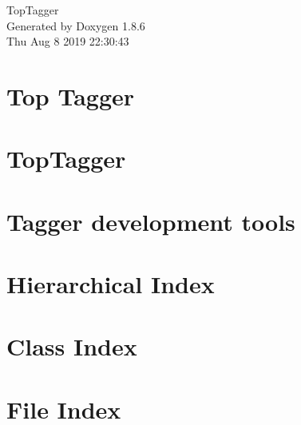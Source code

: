 \documentclass[twoside]{book}
\newcommand{\clearemptydoublepage}{%
  \newpage{\pagestyle{empty}\cleardoublepage}%
}
\begin{document}
\hypersetup{pageanchor=false}
\begin{titlepage}
\vspace*{7cm}
\begin{center}%
{\Large Top\-Tagger }\\
\vspace*{1cm}
{\large Generated by Doxygen 1.8.6}\\
\vspace*{0.5cm}
{\small Thu Aug 8 2019 22:30:43}\\
\end{center}
\end{titlepage}
\clearemptydoublepage
\tableofcontents
\clearemptydoublepage
{}
\hypersetup{pageanchor=true}

\chapter{Top Tagger}
\label{index}\hypertarget{index}{}
\chapter{Top\-Tagger}
\label{md__home_travis_build_susy2015_TopTagger_README}
\hypertarget{md__home_travis_build_susy2015_TopTagger_README}{}

\chapter{Tagger development tools}
\label{md__home_travis_build_susy2015_TopTagger_Tools_README}
\hypertarget{md__home_travis_build_susy2015_TopTagger_Tools_README}{}

\chapter{Hierarchical Index}

\chapter{Class Index}

\chapter{File Index}

\end{document}
